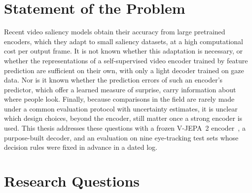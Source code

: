 \section{Statement of the Problem}\label{sec:problem}


Recent video saliency models obtain their accuracy from large pretrained
encoders, which they adapt to small saliency datasets, at a high computational
cost per output frame. It is not known whether this adaptation is necessary, or
whether the representations of a self-supervised video encoder trained by
feature prediction are sufficient on their own, with only a light decoder
trained on gaze data. Nor is it known whether the prediction errors of such an
encoder's predictor, which offer a learned measure of surprise, carry
information about where people look. Finally, because comparisons in the field
are rarely made under a common evaluation protocol with uncertainty estimates,
it is unclear which design choices, beyond the encoder, still matter once a
strong encoder is used. This thesis addresses these questions with a frozen
\acrshort{V-JEPA}~2 encoder~\cite{murlabadia2026vjepa21}, a purpose-built decoder, and an
evaluation on nine eye-tracking test sets whose decision rules were fixed in
advance in a dated log.

\section{Research Questions}\label{sec:questions}



